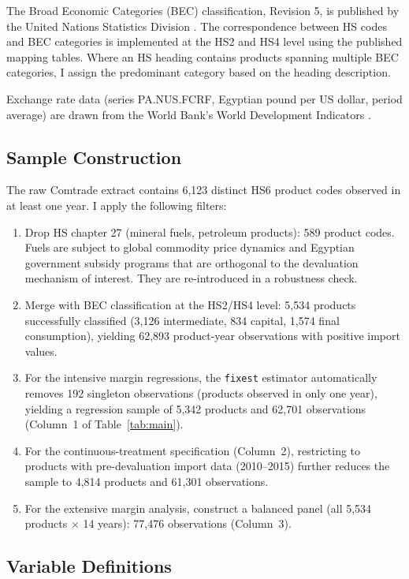 \documentclass[12pt]{article}
\begin{document}
The Broad Economic Categories (BEC) classification, Revision 5, is published by the United Nations Statistics Division \citep{unstats2018bec}. The correspondence between HS codes and BEC categories is implemented at the HS2 and HS4 level using the published mapping tables. Where an HS heading contains products spanning multiple BEC categories, I assign the predominant category based on the heading description.

Exchange rate data (series PA.NUS.FCRF, Egyptian pound per US dollar, period average) are drawn from the World Bank's World Development Indicators \citep{worldbank2024wdi}.

\subsection{Sample Construction}

The raw Comtrade extract contains 6,123 distinct HS6 product codes observed in at least one year. I apply the following filters:
\begin{enumerate}
\item Drop HS chapter 27 (mineral fuels, petroleum products): 589 product codes. Fuels are subject to global commodity price dynamics and Egyptian government subsidy programs that are orthogonal to the devaluation mechanism of interest. They are re-introduced in a robustness check.
\item Merge with BEC classification at the HS2/HS4 level: 5,534 products successfully classified (3,126 intermediate, 834 capital, 1,574 final consumption), yielding 62,893 product-year observations with positive import values.
\item For the intensive margin regressions, the \texttt{fixest} estimator automatically removes 192 singleton observations (products observed in only one year), yielding a regression sample of 5,342 products and 62,701 observations (Column~1 of Table~\ref{tab:main}).
\item For the continuous-treatment specification (Column~2), restricting to products with pre-devaluation import data (2010--2015) further reduces the sample to 4,814 products and 61,301 observations.
\item For the extensive margin analysis, construct a balanced panel (all 5,534 products $\times$ 14 years): 77,476 observations (Column~3).
\end{enumerate}

\subsection{Variable Definitions}
\end{document}
